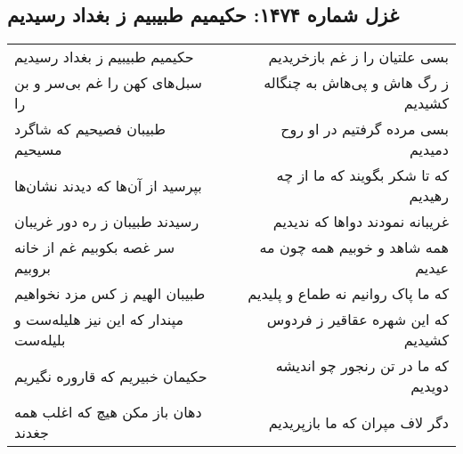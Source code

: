 \begin{center}
\section*{غزل شماره ۱۴۷۴: حکیمیم طبیبیم ز بغداد رسیدیم}
\label{sec:1474}
\begin{longtable}{l p{0.5cm} r}
حکیمیم طبیبیم ز بغداد رسیدیم
&&
بسی علتیان را ز غم بازخریدیم
\\
سبل‌های کهن را غم بی‌سر و بن را
&&
ز رگ هاش و پی‌هاش به چنگاله کشیدیم
\\
طبیبان فصیحیم که شاگرد مسیحیم
&&
بسی مرده گرفتیم در او روح دمیدیم
\\
بپرسید از آن‌ها که دیدند نشان‌ها
&&
که تا شکر بگویند که ما از چه رهیدیم
\\
رسیدند طبیبان ز ره دور غریبان
&&
غریبانه نمودند دواها که ندیدیم
\\
سر غصه بکوبیم غم از خانه بروبیم
&&
همه شاهد و خوبیم همه چون مه عیدیم
\\
طبیبان الهیم ز کس مزد نخواهیم
&&
که ما پاک روانیم نه طماع و پلیدیم
\\
مپندار که این نیز هلیله‌ست و بلیله‌ست
&&
که این شهره عقاقیر ز فردوس کشیدیم
\\
حکیمان خبیریم که قاروره نگیریم
&&
که ما در تن رنجور چو اندیشه دویدیم
\\
دهان باز مکن هیچ که اغلب همه جغدند
&&
دگر لاف مپران که ما بازپریدیم
\\
\end{longtable}
\end{center}
